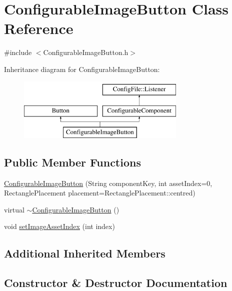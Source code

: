 \hypertarget{classConfigurableImageButton}{}\section{Configurable\+Image\+Button Class Reference}
\label{classConfigurableImageButton}


{\ttfamily \#include $<$Configurable\+Image\+Button.\+h$>$}

Inheritance diagram for Configurable\+Image\+Button\+:\begin{figure}[H]
\begin{center}
\leavevmode
\includegraphics[height=3.000000cm]{classConfigurableImageButton}
\end{center}
\end{figure}
\subsection*{Public Member Functions}
\begin{DoxyCompactItemize}
\item 
\mbox{\hyperlink{classConfigurableImageButton_ab18db09f57b5e1094045341241cbec39}{Configurable\+Image\+Button}} (String component\+Key, int asset\+Index=0, Rectangle\+Placement placement=Rectangle\+Placement\+::centred)
\item 
virtual \mbox{\hyperlink{classConfigurableImageButton_a100b754579b9bbd4468d4e40d4e3f88a}{$\sim$\+Configurable\+Image\+Button}} ()
\item 
void \mbox{\hyperlink{classConfigurableImageButton_a0926452285a8f6fe65b409b610d1b8cf}{set\+Image\+Asset\+Index}} (int index)
\end{DoxyCompactItemize}
\subsection*{Additional Inherited Members}


\subsection{Constructor \& Destructor Documentation}
\mbox{\label{classConfigurableImageButton_ab18db09f57b5e1094045341241cbec39}} 
